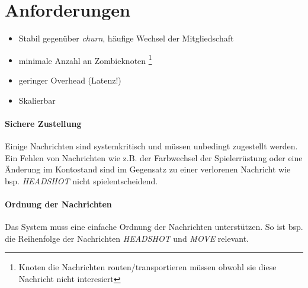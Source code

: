 \section{Anforderungen}
\begin{itemize}
\item Stabil gegenüber \emph{churn}, häufige Wechsel der Mitgliedschaft
\item minimale Anzahl an Zombieknoten \footnote{Knoten die Nachrichten routen/transportieren müssen obwohl sie diese Nachricht nicht interesiert}
\item geringer Overhead (Latenz!)
\item Skalierbar
\end{itemize}



\paragraph{Sichere Zustellung} Einige Nachrichten sind systemkritisch und müssen unbedingt zugestellt werden. Ein Fehlen von Nachrichten wie z.B. der Farbwechsel der Spielerrüstung oder eine Änderung im Kontostand sind im Gegensatz zu einer verlorenen Nachricht wie bsp. \emph{HEADSHOT} nicht spielentscheidend. 

\paragraph{Ordnung der Nachrichten} Das System muss eine einfache Ordnung der Nachrichten unterstützen. So ist bsp. die Reihenfolge der Nachrichten \emph{HEADSHOT} und \emph{MOVE} relevant.
